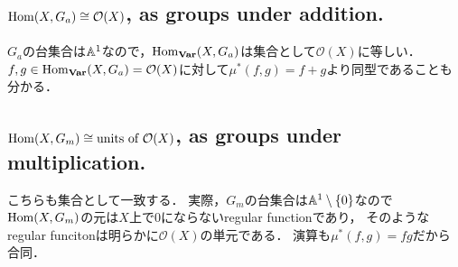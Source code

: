 \documentclass[a4paper]{jsarticle}
\begin{document}
    \subsection{$\operatorname{Hom}(X,G_a) \cong \mathcal{O}(X)$, as groups under addition.}
    $G_a$の台集合は$\mathbb{A}^1$なので，$\operatorname{Hom}_{\mathbf{Var}}(X,G_a)$は集合として$\mathcal{O}(X)$に等しい．
    $f,g \in \operatorname{Hom}_{\mathbf{Var}}(X,G_a)=\mathcal{O}(X)$に対して$\mu^{\ast}(f,g)=f+g$より同型であることも分かる．

    \subsection{$\operatorname{Hom}(X,G_m) \cong \mbox{units of }\mathcal{O}(X)$, as groups under multiplication.}
    こちらも集合として一致する．
    実際，$G_m$の台集合は$\mathbb{A}^1 \setminus \{0\}$なので
    $\operatorname{Hom}(X,G_m)$の元は$X$上で0にならないregular functionであり，
    そのようなregular funcitonは明らかに$\mathcal{O}(X)$の単元である．
    演算も$\mu^{\ast}(f,g)=fg$だから合同．
\end{document}
